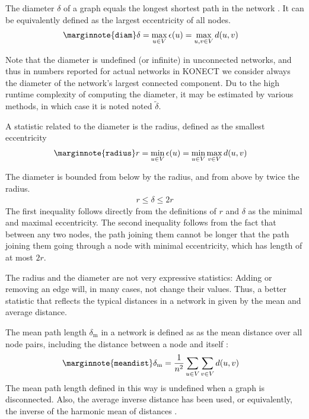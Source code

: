 \documentclass{article}
\begin{document}
The diameter $\delta$ of a graph equals the longest shortest path in the
network \citep{b779}.  It can be equivalently defined as the largest eccentricity of
all nodes.
\begin{align}
  \marginnote{\texttt{diam}} \delta &= \max_{u \in V} \epsilon(u) =
  \max_{u,v \in V} d(u,v)
\end{align}

Note that the diameter is undefined (or infinite) in unconnected
networks, and thus in numbers reported for actual networks in KONECT we
consider always the diameter of the network's largest connected
component.  Du to the high runtime complexity of computing the diameter,
it may be estimated by various methods, in which case it is noted noted
$\tilde \delta$.

A statistic related to the diameter is the radius, defined as the
smallest eccentricity
\begin{align}
  \marginnote{\texttt{radius}} r &= \min_{u \in V} \epsilon(u) = \min_{u
    \in V} \max_{v \in V} d(u,v)
\end{align}

The diameter is bounded from below by the radius, and from above by
twice the radius.  
\begin{align*}
  r \leq \delta \leq 2r
\end{align*}
The first inequality follows directly from the definitions of $r$ and
$\delta$ as the minimal and maximal eccentricity.  The second inequality
follows from the fact that between any two nodes, the path joining them
cannot be longer that the path joining them going through a node with
minimal eccentricity, which has length of at most $2r$. 

The radius and the diameter are not very expressive statistics: Adding
or removing an edge will, in many cases, not change their values.  Thus,
a better statistic that reflects the typical distances in a network in
given by the mean and average distance.

The mean path length $\delta_{\mathrm m}$ in a network is defined as as
the mean distance over all node pairs, including the distance between a
node and itself \citep{b779}:
\begin{align}
  \marginnote{\texttt{meandist}} \delta_{\mathrm m} &= \frac 1 {n^2}
  \sum_{u \in V} \sum_{v\in V} d(u,v)
\end{align}
The mean path length defined in this way is undefined when a graph is
disconnected.  Also, the average inverse distance has been used, or
equivalently, the inverse of the harmonic mean of distances \citep{b877}. 
\end{document}
